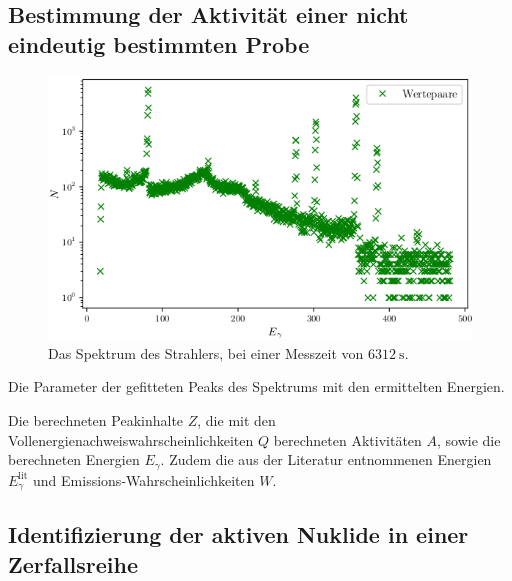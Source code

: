 \subsection{Bestimmung der Aktivität einer nicht eindeutig bestimmten Probe}

\begin{figure}
	\centering
	\includegraphics[width=\linewidth-70pt,height=\textheight-70pt,keepaspectratio]{content/images/D.png}
	\caption{Das Spektrum des Strahlers, bei einer Messzeit von $\SI{6312}{\second}$.}
	\label{fig:Ba}
\end{figure}

\begin{table}
	\centering
	\caption{Die Parameter der gefitteten Peaks des Spektrums mit den ermittelten Energien.}
	
	\label{tab:parameterBa}
\end{table}

\begin{table}
	\centering
	\caption{Die berechneten Peakinhalte $Z$, die mit den Vollenergienachweiswahrscheinlichkeiten $Q$ berechneten Aktivitäten $A$,  sowie die berechneten Energien $E_\gamma$.  Zudem die aus der Literatur entnommenen Energien $E_\gamma^\text{lit}$ und Emissions-Wahrscheinlichkeiten $W$.}
	
	\label{tab:ABa}
\end{table}

\subsection{Identifizierung der aktiven Nuklide in einer Zerfallsreihe}

